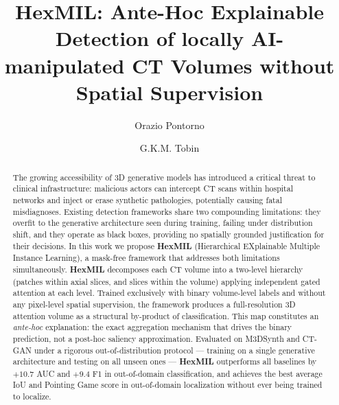 \documentclass[sigconf, screen, review, anonymous]{acmart}
\begin{document}
\title{HexMIL: Ante-Hoc Explainable Detection of locally AI-manipulated CT Volumes without Spatial Supervision}

\author{Orazio Pontorno}
\author{G.K.M. Tobin}
\authornotemark[1]

\renewcommand{\shortauthors}{Pontorno et al.}

\begin{abstract}
The growing accessibility of 3D generative models has introduced a critical threat to clinical infrastructure: malicious actors can intercept CT scans within hospital networks and inject or erase synthetic pathologies, potentially causing fatal misdiagnoses. Existing detection frameworks share two compounding limitations: they overfit to the generative architecture seen during training, failing under distribution shift, and they operate as black boxes, providing no spatially grounded justification for their decisions. In this work we propose \textbf{HexMIL} (Hierarchical EXplainable Multiple Instance Learning), a mask-free framework that addresses both limitations simultaneously. \textbf{HexMIL} decomposes each CT volume into a two-level hierarchy (patches within axial slices, and slices within the volume) applying independent gated attention at each level. Trained exclusively with binary volume-level labels and without any pixel-level spatial supervision, the framework produces a full-resolution 3D attention volume as a structural by-product of classification. This map constitutes an \emph{ante-hoc} explanation: the exact aggregation mechanism that drives the binary prediction, not a post-hoc saliency approximation. Evaluated on M3DSynth and CT-GAN under a rigorous out-of-distribution protocol --- training on a single generative architecture and testing on all unseen ones --- \textbf{HexMIL} outperforms all baselines by $+10.7$ AUC and $+9.4$ F1 in out-of-domain classification, and achieves the best average IoU and Pointing Game score in out-of-domain localization without ever being trained to localize.
\end{abstract}
\end{document}
